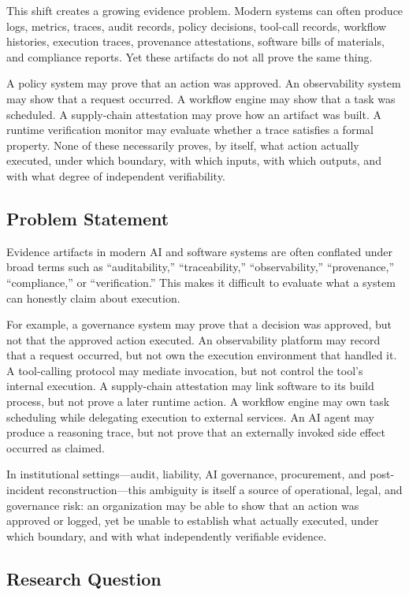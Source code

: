 \documentclass[11pt]{article}
\begin{document}
This shift creates a growing evidence problem. Modern systems can often produce logs, metrics, traces, audit records, policy decisions, tool-call records, workflow histories, execution traces, provenance attestations, software bills of materials, and compliance reports. Yet these artifacts do not all prove the same thing.

A policy system may prove that an action was approved. An observability system may show that a request occurred. A workflow engine may show that a task was scheduled. A supply-chain attestation may prove how an artifact was built. A runtime verification monitor may evaluate whether a trace satisfies a formal property. None of these necessarily proves, by itself, what action actually executed, under which boundary, with which inputs, with which outputs, and with what degree of independent verifiability.

\subsection{Problem Statement}

Evidence artifacts in modern AI and software systems are often conflated under broad terms such as ``auditability,'' ``traceability,'' ``observability,'' ``provenance,'' ``compliance,'' or ``verification.'' This makes it difficult to evaluate what a system can honestly claim about execution.

For example, a governance system may prove that a decision was approved, but not that the approved action executed. An observability platform may record that a request occurred, but not own the execution environment that handled it. A tool-calling protocol may mediate invocation, but not control the tool's internal execution. A supply-chain attestation may link software to its build process, but not prove a later runtime action. A workflow engine may own task scheduling while delegating execution to external services. An AI agent may produce a reasoning trace, but not prove that an externally invoked side effect occurred as claimed.

In institutional settings---audit, liability, AI governance, procurement, and post-incident reconstruction---this ambiguity is itself a source of operational, legal, and governance risk: an organization may be able to show that an action was approved or logged, yet be unable to establish what actually executed, under which boundary, and with what independently verifiable evidence.

\subsection{Research Question}
\end{document}
